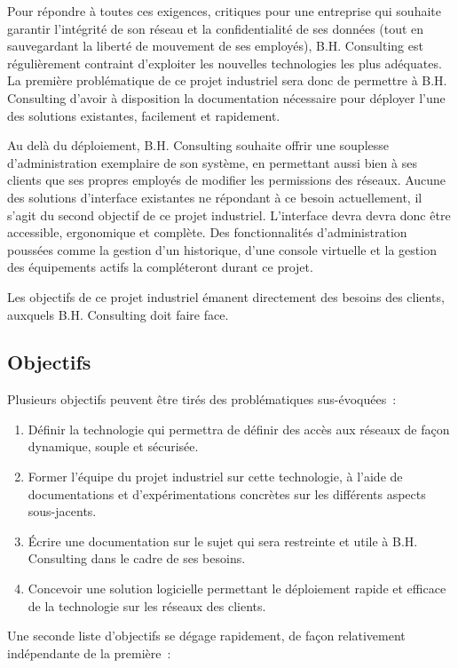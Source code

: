 Pour répondre à toutes ces exigences, critiques pour une entreprise qui souhaite garantir l'intégrité de son réseau et la confidentialité de ses données (tout en sauvegardant la liberté de mouvement de ses employés), B.H. Consulting est régulièrement contraint d'exploiter les nouvelles technologies les plus adéquates. La première problématique de ce projet industriel sera donc de permettre à B.H. Consulting d'avoir à disposition la documentation nécessaire pour déployer l'une des solutions existantes, facilement et rapidement.

Au delà du déploiement, B.H. Consulting souhaite offrir une souplesse d'administration exemplaire de son système, en permettant aussi bien à ses clients que ses propres employés de modifier les permissions des réseaux. Aucune des solutions d'interface existantes ne répondant à ce besoin actuellement, il s'agit du second objectif de ce projet industriel. L'interface devra devra donc être accessible, ergonomique et complète. Des fonctionnalités d'administration poussées comme la gestion d'un historique, d'une console virtuelle et la gestion des équipements actifs la compléteront durant ce projet.

Les objectifs de ce projet industriel émanent directement des besoins des clients, auxquels B.H. Consulting doit faire face.

\subsection{Objectifs}

Plusieurs objectifs peuvent être tirés des problématiques sus-évoquées~:

\begin{enumerate}
\item Définir la technologie qui permettra de définir des accès aux réseaux de façon dynamique, souple et sécurisée.
\item Former l'équipe du projet industriel sur cette technologie, à l'aide de documentations et d'expérimentations concrètes sur les différents aspects sous-jacents.
\item Écrire une documentation sur le sujet qui sera restreinte et utile à B.H. Consulting dans le cadre de ses besoins.
\item Concevoir une solution logicielle permettant le déploiement rapide et efficace de la technologie sur les réseaux des clients.
\end{enumerate}

Une seconde liste d'objectifs se dégage rapidement, de façon relativement indépendante de la première~:

